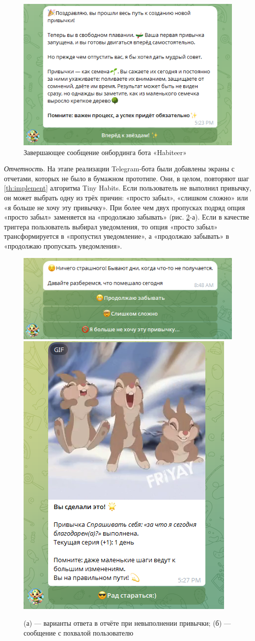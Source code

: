 \documentclass[pdflatex,sn-mathphys-num]{sn-jnl}%
\theoremstyle{thmstyleone}%
\theoremstyle{thmstyletwo}%
\theoremstyle{thmstylethree}%
\begin{document}
\begin{figure}[h]
    \centering
    \includegraphics[width=0.6\linewidth]{figures/Bot/bot_onboarding_end.png}
    \caption{Завершающее сообщение онбординга бота «Habiteer»}
    \label{fig:bot_onboarding_end}
\end{figure}

\textit{Отчетность}. На этапе реализации Telegram-бота были добавлены экраны с отчетами, которых не было в бумажном прототипе. Они, в целом, повторяют шаг \ref{th:implement} алгоритма Tiny Habits. Если пользователь не выполнил привычку, он может выбрать одну из трёх причин: «просто забыл», «слишком сложно» или «я больше не хочу эту привычку». При более чем двух пропусках подряд опция «просто забыл» заменяется на «продолжаю забывать» (рис. \ref{fig:report_screens}-а). Если в качестве триггера пользователь выбирал уведомления, то опция «просто забыл» трансформируется в «пропустил уведомление», а «продолжаю забывать» в «продолжаю пропускать уведомления».

\begin{figure}
    \centering
    \includegraphics[width=0.49\linewidth]{figures/Bot/bot_report.png}
    \includegraphics[width=0.49\linewidth]{figures/Bot/bot_report_praise.png}
    \caption{(а) — варианты ответа в отчёте при невыполнении привычки; (б) — сообщение с похвалой пользователю}
    \label{fig:report_screens}
\end{figure}
\end{document}
